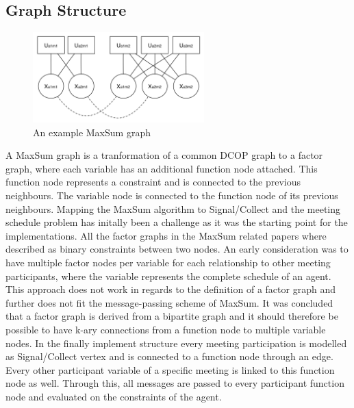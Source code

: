 \subsection{Graph Structure}

\begin{figure}[H]
\includegraphics[width=250px]{graphics/maxsum_graph}
\centering
\caption{An example MaxSum graph}
\label{fig:maxsum_graph}
\end{figure}

A MaxSum graph is a tranformation of a common DCOP graph to a factor graph, where each variable has an additional function node attached. This function node represents a constraint and is connected to the previous neighbours. The variable node is connected to the function node of its previous neighbours. Mapping the MaxSum algorithm to Signal/Collect and the meeting schedule problem has initally been a challenge as it was the starting point for the implementations. All the factor graphs in the MaxSum related papers where described as binary constraints between two nodes. An early consideration was to have multiple factor nodes per variable for each relationship to other meeting participants, where the variable represents the complete schedule of an agent.  This approach does not work in regards to the definition of a factor graph and further does not fit the message-passing scheme of MaxSum. It was concluded that a factor graph is derived from a bipartite graph and it should therefore be possible to have k-ary connections from a function node to multiple variable nodes. In the finally implement structure every meeting participation is modelled as Signal/Collect vertex and is connected to a function node through an edge. Every other participant variable of a specific meeting is linked to this function node as well. Through this, all messages are passed to every participant function node and evaluated on the constraints of the agent.

